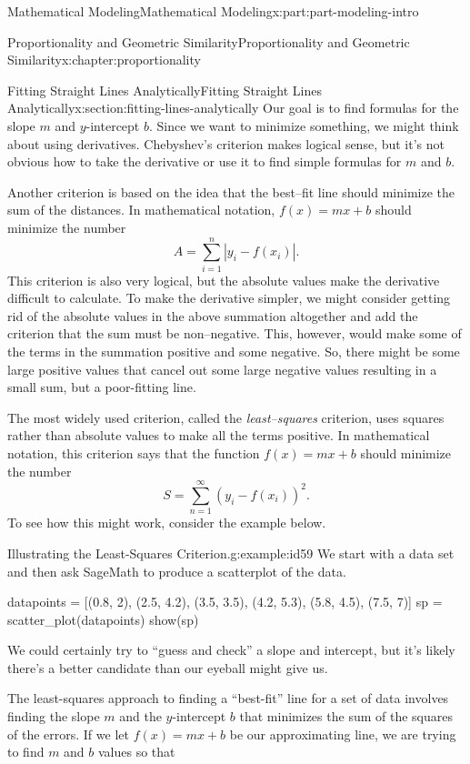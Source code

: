 \documentclass[oneside,10pt,]{book}
\numberwithin{equation}{section}
\begin{document}
\begin{partptx}{Mathematical Modeling}{}{Mathematical Modeling}{}{}{x:part:part-modeling-intro}
\begin{chapterptx}{Proportionality and Geometric Similarity}{}{Proportionality and Geometric Similarity}{}{}{x:chapter:proportionality}
\begin{sectionptx}{Fitting Straight Lines Analytically}{}{Fitting Straight Lines Analytically}{}{}{x:section:fitting-lines-analytically}
Our goal is to find formulas for the slope \(m\) and \(y\)-intercept \(b\). Since we want to minimize something, we might think about using derivatives. Chebyshev’s criterion makes logical sense, but it’s not obvious how to take the derivative or use it to find simple formulas for \(m\) and \(b\).%
\par
Another criterion is based on the idea that the best–fit line should minimize the sum of the distances. In mathematical notation, \(f(x) = mx + b\) should minimize the number%
%
\begin{equation*}
A = \sum_{i=1}^n |y_i - f(x_i)|.
\end{equation*}
This criterion is also very logical, but the absolute values make the derivative difficult to calculate. To make the derivative simpler, we might consider getting rid of the absolute values in the above summation altogether and add the criterion that the sum must be non–negative. This, however, would make some of the terms in the summation positive and some negative. So, there might be some large positive values that cancel out some large negative values resulting in a small sum, but a poor-fitting line.%
\par
The most widely used criterion, called the \emph{least–squares} criterion, uses squares rather than absolute values to make all the terms positive. In mathematical notation, this criterion says that the function \(f(x) = mx + b\) should minimize the number%
%
\begin{equation*}
S = \sum_{n=1}^\infty (y_i-f(x_i))^2.
\end{equation*}
To see how this might work, consider the example below.%
\begin{example}{Illustrating the Least-Squares Criterion.}{g:example:id59}%
We start with a data set and then ask SageMath to produce a scatterplot of the data.%
\begin{sageinput}
datapoints = [(0.8, 2), (2.5, 4.2), (3.5, 3.5), (4.2, 5.3), (5.8, 4.5), (7.5, 7)]
sp = scatter_plot(datapoints)
show(sp)
\end{sageinput}
We could certainly try to ``guess and check'' a slope and intercept, but it's likely there's a better candidate than our eyeball might give us.%
\par
The least-squares approach to finding a ``best-fit'' line for a set of data involves finding the slope \(m\) and the \(y\)-intercept \(b\) that minimizes the sum of the squares of the errors.  If we let \(f(x) = mx + b\) be our approximating line, we are trying to find \(m\) and \(b\) values so that%

\end{example}
\end{sectionptx}
\end{chapterptx}
\end{partptx}
\end{document}

